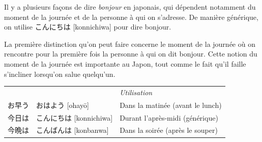 \documentclass[a4paper,11pt,final]{article}
\newcommand{\sectit}[1]{\bigskip\hspace{-5mm}{\color{sectionblue}$\blacksquare$~~\Large\bfseries #1}}
\newcommand{\romaji}[1]{{\footnotesize[#1]}}
\begin{document}

\vspace{15mm}
	

Il y a plusieurs façons de dire \textit{bonjour} en japonais, qui dépendent notamment du moment de la journée et de la personne à qui on s'adresse. De manière générique, on utilise こんにちは \romaji{konnichiwa} pour dire bonjour.


\sectit{Au long de la journée}

La première distinction qu'on peut faire concerne le moment de la journée où on rencontre pour la première fois la personne à qui on dit bonjour. Cette notion du moment de la journée est importante au Japon, tout comme le fait qu'il faille s'incliner lorsqu'on salue quelqu'un.

\hspace{5mm}\begin{tabular}{|p{2cm}p{4.5cm}l}
	\multicolumn{1}{l}{}&& \it\small Utilisation \\
	お早う			& おはよう \romaji{ohay\=o}				& Dans la matinée (avant le lunch) \\
	今日は			& こんにちは \romaji{konnichiwa}			& Durant l'après-midi (générique) \\
	今晩は			& こんばんは \romaji{konbanwa}			& Dans la soirée (après le souper)
\end{tabular}
\end{document}
